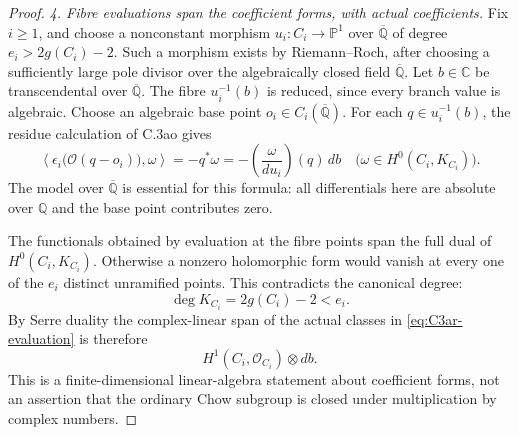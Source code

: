 \begin{proof}
\emph{4. Fibre evaluations span the coefficient forms, with actual coefficients.}
Fix $i\ge1$, and choose a nonconstant morphism
$u_i:C_i\to\mathbb P^1$ over $\overline{\mathbb Q}$ of degree
$e_i>2g(C_i)-2$. Such a morphism exists by Riemann--Roch, after
choosing a sufficiently large pole divisor over the algebraically
closed field $\overline{\mathbb Q}$. Let $b\in\mathbb C$ be
transcendental over $\overline{\mathbb Q}$. The fibre $u_i^{-1}(b)$
is reduced, since every branch value is algebraic. Choose an
algebraic base point $o_i\in C_i(\overline{\mathbb Q})$.
For each $q\in u_i^{-1}(b)$, the residue calculation of C.3ao gives
\begin{equation}\label{eq:C3ar-evaluation}
 \left\langle\epsilon_i\bigl(\mathcal O(q-o_i)\bigr),\omega\right\rangle
   =-q^*\omega
   =-\left(\frac{\omega}{du_i}\right)(q)\,db
       \quad\bigl(\omega\in H^0(C_i,K_{C_i})\bigr).
\end{equation}
The model over $\overline{\mathbb Q}$ is essential for this formula:
all differentials here are absolute over $\mathbb Q$ and the
base point contributes zero.

The functionals obtained by evaluation at the fibre points span
the full dual of $H^0(C_i,K_{C_i})$. Otherwise a nonzero holomorphic
form would vanish at every one of the $e_i$ distinct unramified
points. This contradicts the canonical degree:
\[
                    \deg K_{C_i}=2g(C_i)-2<e_i.
\]
By Serre duality the complex-linear span of the actual classes
in \eqref{eq:C3ar-evaluation} is therefore
\begin{equation}\label{eq:C3ar-fibre-span}
                  H^1(C_i,\mathcal O_{C_i})\otimes db.
\end{equation}
This is a finite-dimensional linear-algebra statement about
coefficient forms, not an assertion that the ordinary Chow subgroup
is closed under multiplication by complex numbers.


\end{proof}
